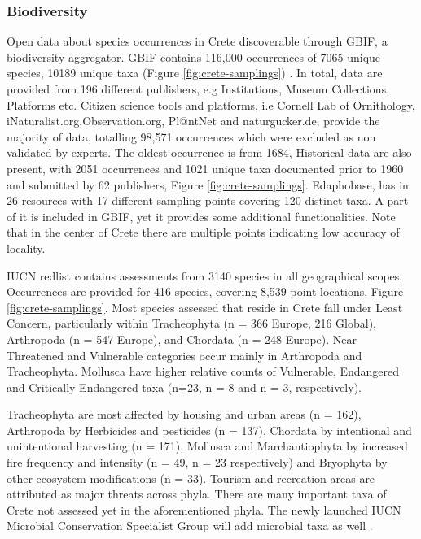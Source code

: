 \documentclass[a4paper,12pt]{article}
\begin{document}
\subsubsection{Biodiversity}
Open data about species occurrences in Crete discoverable through GBIF, a biodiversity aggregator.
GBIF contains 116,000 occurrences of 7065 unique species,
10189 unique taxa (Figure \ref{fig:crete-samplings}) \parencite{gbif.org-user2023occurrence}.
In total, data are provided from 196 different publishers, e.g Institutions, Museum Collections, Platforms etc.
Citizen science tools and platforms, i.e 
Cornell Lab of Ornithology, iNaturalist.org,Observation.org, Pl@ntNet and naturgucker.de,
provide the majority of data, totalling 98,571 occurrences which were excluded as non validated by experts.
The oldest occurrence is from 1684,
Historical data are also present, with 2051 occurrences and 1021 unique taxa documented 
prior to 1960 and submitted by 62 publishers, Figure \ref{fig:crete-samplings}.
Edaphobase, has in 26 resources with 17 different sampling points covering 120 distinct taxa.
A part of it is included in GBIF, yet it provides some additional functionalities. Note that 
in the center of Crete there are multiple points indicating low accuracy of locality.

IUCN redlist contains assessments from 3140 species in all geographical scopes.
Occurrences are provided for 416 species, covering 8,539 point locations, Figure \ref{fig:crete-samplings}.
Most species assessed that reside in Crete fall under Least Concern,
particularly within Tracheophyta (n = 366 Europe, 216 Global), 
Arthropoda (n = 547 Europe), and Chordata (n = 248 Europe). 
Near Threatened and Vulnerable categories occur mainly in Arthropoda and Tracheophyta.
Mollusca have higher relative counts of Vulnerable, Endangered and Critically Endangered taxa (n=23, n = 8 and n = 3, respectively).

Tracheophyta are most affected by housing and urban areas (n = 162), 
Arthropoda by Herbicides and pesticides (n = 137), 
Chordata by intentional and unintentional harvesting (n = 171), 
Mollusca and Marchantiophyta by increased fire frequency and intensity (n = 49, n = 23 respectively)
and Bryophyta by other ecosystem modifications (n = 33).
Tourism and recreation areas are attributed as major threats across phyla.
There are many important taxa of Crete not assessed yet in the aforementioned 
phyla. The newly launched IUCN Microbial Conservation Specialist Group will add microbial taxa as well \parencite{gilbert2025launching}.
\end{document}
